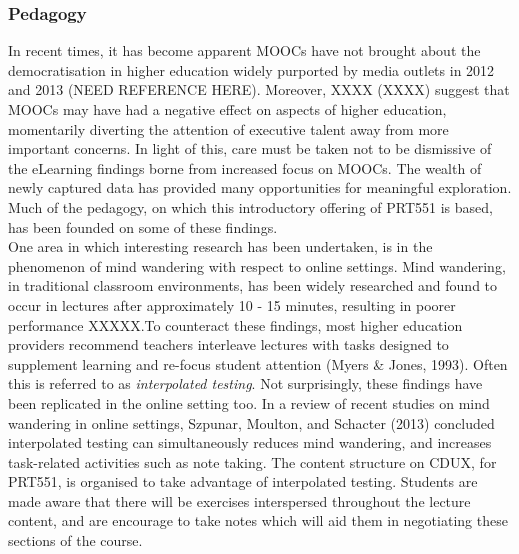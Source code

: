 \documentclass[a4paper]{article}
\begin{document}
\subsubsection{Pedagogy}
In recent times, it has become apparent MOOCs have not brought about the democratisation in higher education widely purported by media outlets in 2012 and 2013 (NEED REFERENCE HERE). Moreover, XXXX (XXXX) suggest that MOOCs may have had a negative effect on aspects of higher education, momentarily diverting the attention of executive talent away from more important concerns. In light of this, care must be taken not to be dismissive of the eLearning findings borne from increased focus on MOOCs. The wealth of newly captured data has provided many opportunities for meaningful exploration. Much of the pedagogy, on which this introductory offering of PRT551 is based, has been founded on some of these findings.\\

One area in which interesting research has been undertaken, is in the phenomenon of mind wandering with respect to online settings. Mind wandering, in traditional classroom environments, has been widely researched and found to occur in lectures after approximately 10 - 15 minutes, resulting in poorer performance XXXXX.To counteract these findings, most higher education providers recommend teachers interleave lectures with tasks designed to supplement learning and re-focus student attention (Myers \& Jones, 1993). Often this is referred to as \textit{interpolated testing}. Not surprisingly, these findings have been replicated in the online setting too. In a review of recent studies on mind wandering in online settings, Szpunar, Moulton, and Schacter (2013) concluded interpolated testing can simultaneously reduces mind wandering, and increases task-related activities such as note taking. The content structure on CDUX, for PRT551, is organised to take advantage of interpolated testing. Students are made aware that there will be exercises interspersed throughout the lecture content, and are encourage to take notes which will aid them in negotiating these sections of the course.\\
\end{document}
